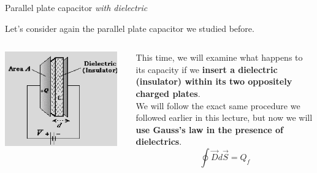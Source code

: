 \begin{frame}{Parallel plate capacitor {\em with dielectric}}

Let's consider again the parallel plate capacitor we studied before.\\

\vspace{0.4cm}

\begin{columns}
  \begin{column}{0.45\textwidth}
   \begin{center}
     \includegraphics[width=0.95\textwidth]{./images/schematics/parallel_plate_capacitor_dielectric.png}\\
   \end{center}
  \end{column}
  \begin{column}{0.55\textwidth}
    This time, we will examine what happens to its capacity if we {\bf insert a dielectric
    (insulator) within its two oppositely charged plates}.\\
    \vspace{0.2cm}
    We will follow the exact same procedure we followed earlier in this lecture,
    but now we will {\bf use Gauss's law in the presence of dielectrics}.\\
    \begin{equation*}
       \oint \vec{D} d\vec{S} = Q_f
    \end{equation*}
  \end{column}
\end{columns}

\end{frame}

